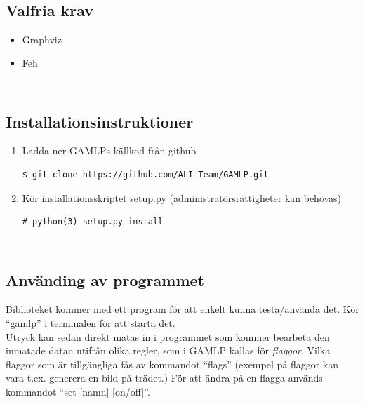 \documentclass[12pt,a4paper]{article}
\begin{document}
\begin{appendices}
\subsection{\\Valfria krav}
\begin{itemize}
  \item Graphviz
  \item Feh
\end{itemize}
\subsection{\\Installationsinstruktioner}
\begin{enumerate}
  \item Ladda ner GAMLPs källkod från github \begin{verbatim}$ git clone https://github.com/ALI-Team/GAMLP.git\end{verbatim}
  \item Kör installationsskriptet setup.py (administratörsrättigheter kan behövas) \begin{verbatim}# python(3) setup.py install\end{verbatim}
\end{enumerate}
\subsection{\\Använding av programmet}
Biblioteket kommer med ett program för att enkelt kunna testa/använda det. Kör ``gamlp'' i terminalen för att starta det.\\
Utryck kan sedan direkt matas in i programmet som kommer bearbeta den inmatade datan utifrån olika regler, som i GAMLP kallas för \textit{flaggor}. Vilka flaggor som är tillgängliga fås av kommandot ``flags'' (exempel på flaggor kan vara t.ex. generera en bild på trädet.)  För att ändra på en flagga används kommandot ``set [namn] [on/off]''.
\end{appendices}
\end{document}
